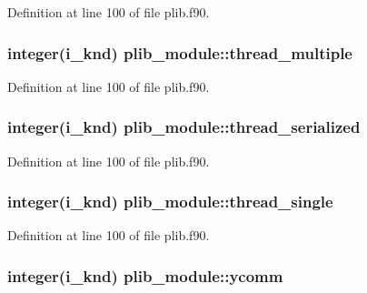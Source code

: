 Definition at line 100 of file plib.\-f90.

\hypertarget{classplib__module_af4045f02bfdd6ce98120023046d4c1ca}{
\subsubsection[{thread\-\_\-multiple}]{\setlength{\rightskip}{0pt plus 5cm}integer(i\-\_\-knd) plib\-\_\-module\-::thread\-\_\-multiple}}\label{classplib__module_af4045f02bfdd6ce98120023046d4c1ca}


Definition at line 100 of file plib.\-f90.

\hypertarget{classplib__module_a117ac57a3b41c9fae508f8674fe45f0f}{
\subsubsection[{thread\-\_\-serialized}]{\setlength{\rightskip}{0pt plus 5cm}integer(i\-\_\-knd) plib\-\_\-module\-::thread\-\_\-serialized}}\label{classplib__module_a117ac57a3b41c9fae508f8674fe45f0f}


Definition at line 100 of file plib.\-f90.

\hypertarget{classplib__module_a976973aed6846d0da2cc7fc29e0f0097}{
\subsubsection[{thread\-\_\-single}]{\setlength{\rightskip}{0pt plus 5cm}integer(i\-\_\-knd) plib\-\_\-module\-::thread\-\_\-single}}\label{classplib__module_a976973aed6846d0da2cc7fc29e0f0097}


Definition at line 100 of file plib.\-f90.

\hypertarget{classplib__module_af98dd05eb9d15041b5c783c6be090495}{
\subsubsection[{ycomm}]{\setlength{\rightskip}{0pt plus 5cm}integer(i\-\_\-knd) plib\-\_\-module\-::ycomm}}\label{classplib__module_af98dd05eb9d15041b5c783c6be090495}


